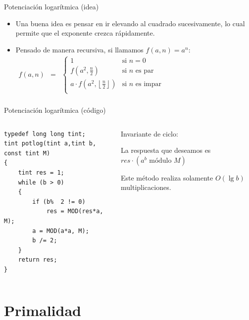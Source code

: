 \documentclass{beamer}
\begin{document}
\begin{frame}{Potenciación logarítmica (idea)}
  \begin{itemize}
      \item Una buena idea es pensar en ir elevando al cuadrado sucesivamente, lo cual permite que el exponente crezca rápidamente.
      \item Pensado de manera recursiva, si llamamos $f(a,n) = a^n$: \\
              $\begin{array}{rcl}
                     f(a,n) & = & \left \{ \begin{array}{cl}
                                              1  & \mbox{si }n=0 \\
                                              f \left (a^2, \frac{n}{2} \right ) & \mbox{si } n \mbox{ es par} \\
                                              a \cdot f \left (a^2, \left \lfloor \frac{n}{2} \right \rfloor \right ) & \mbox{si } n \mbox{ es impar} \\
                                           \end{array} \right . \\
               \end{array}$
  \end{itemize}
\end{frame}


\begin{frame}[fragile]{Potenciación logarítmica (código)}
\begin{columns}
\begin{column}{0.60\textwidth}
\begin{lstlisting}
typedef long long tint;
tint potlog(tint a,tint b, const tint M)
{
    tint res = 1;
    while (b > 0)
    {
        if (b%  2 != 0)
            res = MOD(res*a, M);
        a = MOD(a*a, M);
        b /= 2;
    }
    return res;
}\end{lstlisting}
\end{column}
\begin{column}{0.45\textwidth}
Invariante de ciclo:

La respuesta que deseamos es $res \cdot (a^b \mbox{ módulo } M)$

Este método realiza solamente $O(\lg b)$ multiplicaciones.
\end{column}
\end{columns}
\end{frame}

\section{Primalidad}
\end{document}
